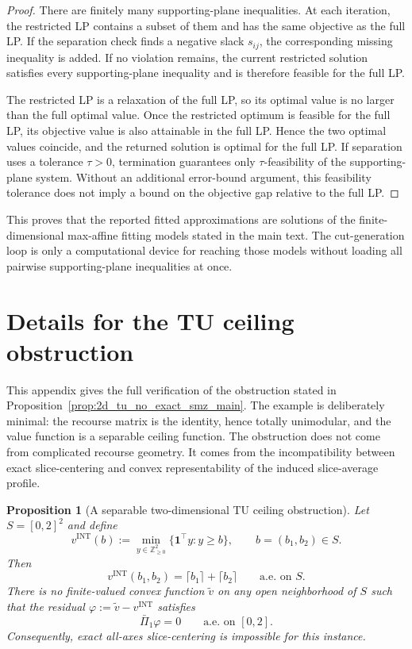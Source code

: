 \documentclass[11pt,letterpaper]{article}
\newtheorem{proposition}[theorem]{Proposition}
\theoremstyle{definition}
\theoremstyle{remark}
\newcommand{\INT}{\mathrm{INT}}
\begin{document}
\begin{proof}
There are finitely many supporting-plane inequalities. At each iteration, the
restricted LP contains a subset of them and has the same objective as the full
LP. If the separation check finds a negative slack $s_{ij}$, the corresponding
missing inequality is added. If no violation remains, the current restricted
solution satisfies every supporting-plane inequality and is therefore feasible
for the full LP.

The restricted LP is a relaxation of the full LP, so its optimal value is no
larger than the full optimal value. Once the restricted optimum is feasible for
the full LP, its objective value is also attainable in the full LP. Hence the
two optimal values coincide, and the returned solution is optimal for the full
LP. If separation uses a tolerance $\tau>0$, termination guarantees only
$\tau$-feasibility of the supporting-plane system. Without an additional
error-bound argument, this feasibility tolerance does not imply a bound on
the objective gap relative to the full LP.
\end{proof}

This proves that the reported fitted approximations are solutions of the
finite-dimensional max-affine fitting models stated in the main text. The
cut-generation loop is only a computational device for reaching those models
without loading all pairwise supporting-plane inequalities at once.

 
\section{Details for the TU ceiling obstruction}
\label{app:tu_ceiling_obstruction}
 

This appendix gives the full verification of the obstruction stated in
Proposition~\ref{prop:2d_tu_no_exact_smz_main}. The example is deliberately
minimal: the recourse matrix is the identity, hence totally unimodular, and
the value function is a separable ceiling function. The obstruction does not
come from complicated recourse geometry. It comes from the incompatibility
between exact slice-centering and convex representability of the induced
slice-average profile.
\begin{proposition}[A separable two-dimensional TU ceiling obstruction]
\label{prop:2d_tu_no_exact_smz_app}
Let $S=[0,2]^2$ and define
$$
v^{\INT}(b)
:=
\min_{y\in\mathbb Z_{\ge0}^2}
\{\mathbf 1^\top y:y\ge b\},
\qquad
b=(b_1,b_2)\in S.
$$
Then
$$
v^{\INT}(b_1,b_2)=\lceil b_1\rceil+\lceil b_2\rceil
\qquad
\text{a.e. on }S.
$$
There is no finite-valued convex function $\widetilde v$ on any open
neighborhood of $S$ such that the residual
$\varphi:=\widetilde v-v^{\INT}$ satisfies
$$
\bar\Pi_1\varphi=0
\qquad
\text{a.e. on }[0,2].
$$
Consequently, exact all-axes slice-centering is impossible for this instance.
\end{proposition}
\end{document}
